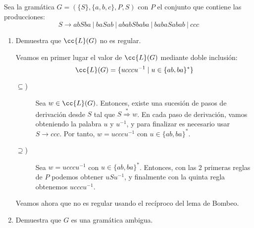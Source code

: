 \documentclass[12pt]{article}
\begin{document}
\begin{ejercicio}
    Sea la gramática $G=(\{S\},\{a,b,c\},P,S)$ con $P$ el conjunto que contiene las producciones:
    \begin{equation*}
        S \rightarrow abSba\ |\ baSab\ |\ ababSbaba\ |\ babaSabab\ |\ ccc
    \end{equation*}
    \begin{enumerate}
        \item Demuestra que $\cc{L}(G)$ no es regular.
        
        Veamos en primer lugar el valor de $\cc{L}(G)$ mediante doble inclusión:
        \begin{equation*}
            \cc{L}(G)=\{ucccu^{-1}\mid u\in \{ab, ba\}^{\ast}\}
        \end{equation*}
        \begin{description}
            \item[$\subseteq$)] Sea $w\in \cc{L}(G)$. Entonces, existe una sucesión de pasos de derivación desde $S$ tal que $S\stackrel{\ast}{\Longrightarrow}w$. En cada paso de derivación, vamos obteniendo la palabra $u$ y $u^{-1}$, y para finalizar es necesario usar $S\to ccc$. Por tanto, $w=ucccu^{-1}$ con $u\in \{ab, ba\}^{\ast}$.
            
            \item[$\supseteq$)] Sea $w=ucccu^{-1}$ con $u\in \{ab, ba\}^{\ast}$. Entonces, con las 2 primeras reglas de $P$ podemos obtener $uSu^{-1}$, y finalmente con la quinta regla obtenemos $ucccu^{-1}$.
        \end{description}

        Veamos ahora que no es regular usando el recíproco del lema de Bombeo.
        \begin{comment}
        Para cada $n\in\bb{N}$, sea $z=$
        \end{comment}
        \item Demuestra que $G$ es una gramática ambigua.
        

\end{enumerate}
\end{ejercicio}
\end{document}
